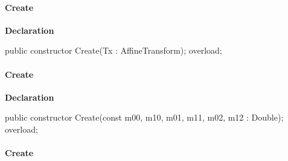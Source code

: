 \documentclass{report}
\newif\ifpdf
\begin{document}
\paragraph*{Create}\hspace*{\fill}

\label{NewPascal.GUI.Geom.AffineTransform-Create}
\begin{list}{}{
\setlength{\itemindent}{0cm}
\setlength{\listparindent}{0cm}
\setlength{\leftmargin}{\evensidemargin}
\addtolength{\leftmargin}{\tmplength}
\settowidth{\labelsep}{X}
\addtolength{\leftmargin}{\labelsep}
\setlength{\labelwidth}{\tmplength}
}
\item[\textbf{Declaration}\hfill]
\ifpdf
\begin{flushleft}
\fi
\begin{ttfamily}
public constructor Create(Tx : AffineTransform); overload;\end{ttfamily}

\ifpdf
\end{flushleft}
\fi

\end{list}
\paragraph*{Create}\hspace*{\fill}

\label{NewPascal.GUI.Geom.AffineTransform-Create}
\begin{list}{}{
\setlength{\itemindent}{0cm}
\setlength{\listparindent}{0cm}
\setlength{\leftmargin}{\evensidemargin}
\addtolength{\leftmargin}{\tmplength}
\settowidth{\labelsep}{X}
\addtolength{\leftmargin}{\labelsep}
\setlength{\labelwidth}{\tmplength}
}
\item[\textbf{Declaration}\hfill]
\ifpdf
\begin{flushleft}
\fi
\begin{ttfamily}
public constructor Create(const m00, m10, m01, m11, m02, m12 : Double); overload;\end{ttfamily}

\ifpdf
\end{flushleft}
\fi

\end{list}
\paragraph*{Create}\hspace*{\fill}
\end{document}
